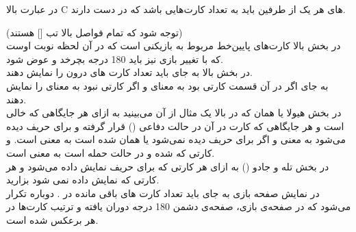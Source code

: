 \documentclass[]{article}
\begin{document}
در عبارت بالا C‌ های هر یک از طرفین باید به تعداد کارت‌هایی باشد که در دست دارند.


(توجه شود که تمام فواصل بالا تب [] هستند)  
\\
در بخش بالا کارت‌های پایین‌خط مربوط به بازیکنی است که در آن لحظه نوبت اوست که با 
تغییر  بازی نیز باید 180 درجه بچرخد و عوض شود.
\\
در بخش بالا به جای  باید تعداد کارت های درون  را نمایش 
دهند.
\\
به جای  اگر در آن قسمت کارتی بود  به معنای  و اگر 
کارتی نبود  به معنای  را نمایش دهند.
\\
در بخش هیولا یا همان  که در بالا یک مثال از آن می‌بینید به 
ازای هر جایگاهی که خالی است  و هر جایگاهی که کارت در آن در حالت دفاعی 
() قرار گرفته و برای حریف دیده می‌شود  به معنی
  و اگر برای حریف دیده نمی‌شود یا همان  شده است 
 به معنی  است. و کارتی که  شده و در حالت حمله 
 است  به 
 معنی  است.
\\
در بخش تله و جادو () به ازای هر کارتی که برای حریف نمایش 
داده می‌شود  و هر کارتی که نمایش داده نمی شود  بزارید.
\\
در نمایش صفحه بازی به جای  باید تعداد کارت های باقی مانده در 
. دوباره تکرار می‌شود که در صفحه‌ی بازی‌، صفحه‌ی دشمن 180 درجه دوران 
یافته و ترتیب کارت‌ها در هر  برعکس شده است.
\end{document}
